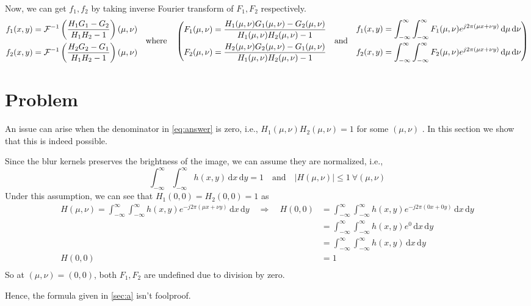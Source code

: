 \documentclass[a4paper, landscape]{article}
\renewcommand{\d}{\, \mathrm{d}}
\begin{document}
Now, we can get $f_1, f_2$ by taking inverse Fourier transform of $F_1, F_2$ respectively.
\begin{equation}{\label{eq:answer}}
	\begin{aligned}
		f_1(x,y) &= \mathcal{F}^{-1}\left(\frac{H_1G_1 - G_2}{H_1H_2 - 1}\right)(\mu,\nu)\\
		f_2(x,y) &= \mathcal{F}^{-1}\left(\frac{H_2G_2 - G_1}{H_1H_2 - 1}\right)(\mu,\nu)\\
	\end{aligned}
	\quad\text{where}\quad
	\left(
	\begin{aligned}
		F_1 (\mu,\nu) &= \frac{H_1 (\mu,\nu)G_1 (\mu,\nu) - G_2 (\mu,\nu)}{H_1 (\mu,\nu)H_2 (\mu,\nu) - 1}\\
		F_2 (\mu,\nu) &= \frac{H_2 (\mu,\nu)G_2 (\mu,\nu) - G_1 (\mu,\nu)}{H_1 (\mu,\nu)H_2 (\mu,\nu) - 1}\\
	\end{aligned}
	\quad\text{and}\quad
	\begin{aligned}
		f_1(x,y) &= \int_{-\infty}^{\infty}\int_{-\infty}^{\infty}F_1(\mu, \nu)e^{j2\pi(\mu x+\nu y)}\d\mu\d\nu\\
		f_2(x,y) &= \int_{-\infty}^{\infty}\int_{-\infty}^{\infty}F_2(\mu, \nu)e^{j2\pi(\mu x+\nu y)}\d\mu\d\nu\\
	\end{aligned}
	\right)
\end{equation}
\section{Problem}
An issue can arise when the denominator in \ref{eq:answer} is zero, i.e., $H_1(\mu,\nu)H_2(\mu,\nu)=1$ for some $(\mu,\nu)$ . In this section we show that this is indeed possible.

Since the blur kernels preserves the brightness of the image, we can assume they are normalized, i.e.,
\begin{equation}
	\int_{-\infty}^{\infty}\int_{-\infty}^{\infty}h(x,y)\d x\d y = 1 \quad\text{and}\quad |H(\mu,\nu)|\leq1\ \forall (\mu,\nu)
\end{equation}
Under this assumption, we can see that $H_1(0,0)=H_2(0,0)=1$ as
\begin{equation}
	\begin{aligned}
		H(\mu, \nu)=\int_{-\infty}^{\infty}\int_{-\infty}^{\infty}h(x, y)e^{-j2\pi(\mu x+\nu y)}\d x\d y
		\quad\Rightarrow\quad
		H(0, 0)
		&=\int_{-\infty}^{\infty}\int_{-\infty}^{\infty}h(x, y)e^{-j2\pi(0 x+0 y)}\d x\d y\\
		&=\int_{-\infty}^{\infty}\int_{-\infty}^{\infty}h(x, y)e^{0}\d x\d y\\
		&=\int_{-\infty}^{\infty}\int_{-\infty}^{\infty}h(x, y)\d x\d y\\
		H(0, 0)&=1\\
	\end{aligned}
\end{equation}
So at $(\mu,\nu)=(0,0)$, both $F_1, F_2$ are undefined due to division by zero.

Hence, the formula given in \ref{sec:a} isn't foolproof.
\end{document}
